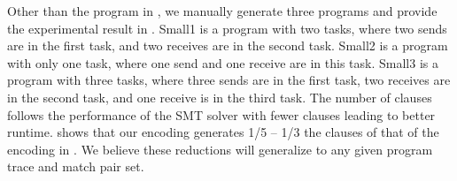 Other than the program in , we manually generate three programs and provide the experimental result in . Small1 is a program with two tasks, where two sends are in the first task, and two receives are in the second task. Small2 is a program with only one task, where one send and one receive are in this task. Small3 is a program with three tasks, where three sends are in the first task, two receives are in the second task, and one receive is in the third task. The number of clauses follows the performance of the SMT solver with fewer clauses leading to better runtime.  shows that our encoding generates  1/5 -- 1/3  the clauses of that of the encoding in \cite{elwakil:padtad10}. We believe these reductions will generalize to any given program trace and match pair set.






